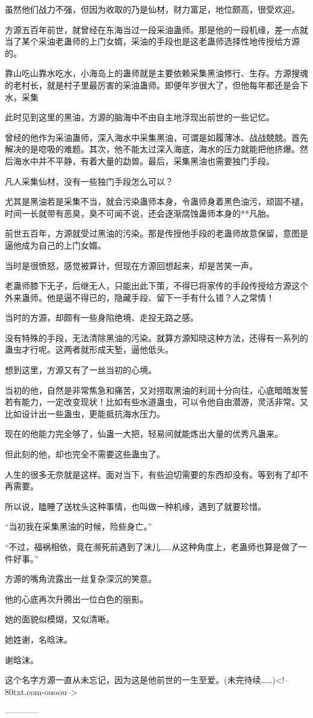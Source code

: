 \begin{this_body}
虽然他们战力不强，但因为收取的乃是仙材，财力富足，地位颇高，很受欢迎。

方源五百年前世，就曾经在东海当过一段采油蛊师。那是他的一段机缘，差一点就当了某个采油老蛊师的上门女婿，采油的手段也是这老蛊师选择性地传授给方源的。

靠山吃山靠水吃水，小海岛上的蛊师就是主要依赖采集黑油修行、生存。方源搜魂的老村长，就是村子里最厉害的采油蛊师。即便年岁很大了，但他每年都还是会下水，采集

此时见到这里的黑油，方源的脑海中不由自主地浮现出前世的一些记忆。

曾经的他作为采油蛊师，深入海水中采集黑油，可谓是如履薄冰、战战兢兢。首先解决的是唿吸的难题。其次，他不能太过深入海底，海水的压力就能把他挤爆。然后海水中并不平静，有着大量的勐兽。最后，采集黑油也需要独门手段。

凡人采集仙材，没有一些独门手段怎么可以？

尤其是黑油若是采集不当，就会污染蛊师本身，令蛊师身着黑色油污，顽固不褪，时间一长就带有恶臭，臭不可闻不说，还会逐渐腐蚀蛊师本身的**凡胎。

前世五百年，方源就受过黑油的污染。那是传授他手段的老蛊师故意保留，意图是逼他成为自己的上门女婿。

当时是很愤怒，感觉被算计，但现在方源回想起来，却是苦笑一声。

老蛊师膝下无子，后继无人，只能出此下策，不得已将家传的手段传授给方源这个外来蛊师。他是逼不得已的，隐藏手段、留下一手有什么错？人之常情！

当时的方源，却颇有一些身陷绝境、走投无路之感。

没有特殊的手段，无法清除黑油的污染。就算方源知晓这种方法，还得有一系列的蛊虫才行呢。这两者就形成天堑，逼他低头。

想到这里，方源又有了一丝当初的心境。

当初的他，自然是非常焦急和痛苦，又对捞取黑油的利润十分向往，心底暗暗发誓若有能力，一定改变现状！比如有些水道蛊虫，可以令他自由潜游，灵活非常。又比如设计出一些蛊虫，更能抵抗海水压力。

现在的他能力完全够了，仙蛊一大把，轻易间就能炼出大量的优秀凡蛊来。

但此刻的他，却也完全不需要这些蛊虫了。

人生的很多无奈就是这样。面对当下，有些迫切需要的东西却没有。等到有了却不再需要。

所以说，瞌睡了送枕头这种事情，也叫做一种机缘，遇到了就要珍惜。

“当初我在采集黑油的时候，险些身亡。”

“不过，福祸相依，竟在濒死前遇到了沫儿……从这种角度上，老蛊师也算是做了一件好事。”

方源的嘴角流露出一丝复杂深沉的笑意。

他的心底再次升腾出一位白色的丽影。

她的面貌似模煳，又似清晰。

她姓谢，名晗沫。

谢晗沫。

这个名字方源一直从未忘记，因为这是他前世的一生至爱。(未完待续……)<!--80txt.com-ouoou-->

------------

\end{this_body}

